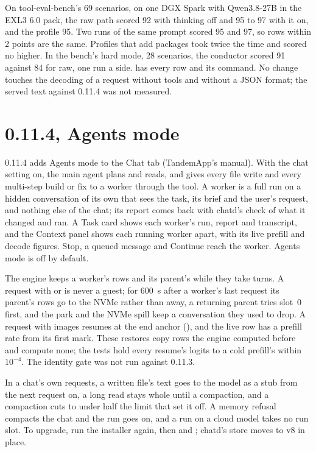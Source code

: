 On tool-eval-bench's 69 scenarios, on one DGX Spark with Qwen3.8-27B in the EXL3 6.0 pack, the raw path scored 92 with thinking off and 95 to 97 with it on, and the  profile 95. Two runs of the same prompt scored 95 and 97, so rows within 2 points are the same. Profiles that add packages took twice the time and scored no higher. In the bench's hard mode, 28 scenarios, the conductor scored 91 against 84 for raw, one run a side.  has every row and its command. No change touches the decoding of a request without tools and without a JSON format; the served text against 0.11.4 was not measured.

\section{0.11.4, Agents mode}\label{sec:changelog-0114}

0.11.4 adds Agents mode to the Chat tab (TandemApp's manual). With the chat setting  on, the main agent plans and reads, and gives every file write and every multi-step build or fix to a worker through the  tool. A worker is a full run on a hidden conversation of its own that sees the task, its brief and the user's request, and nothing else of the chat; its report comes back with chatd's check of what it changed and ran. A Task card shows each worker's run, report and transcript, and the Context panel shows each running worker apart, with its live prefill and decode figures. Stop, a queued message and Continue reach the worker. Agents mode is off by default.

The engine keeps a worker's rows and its parent's while they take turns. A request with  or  is never a guest; for 600~s after a worker's last request its parent's rows go to the NVMe rather than away, a returning parent tries slot~0 first, and the park and the NVMe spill keep a conversation they used to drop. A request with images resumes at the end anchor (), and the live row has a prefill rate from its first mark. These restores copy rows the engine computed before and compute none; the tests hold every resume's logits to a cold prefill's within $10^{-4}$. The identity gate was not run against 0.11.3.

In a chat's own requests, a written file's text goes to the model as a stub from the next request on, a long read stays whole until a compaction, and a compaction cuts to under half the limit that set it off. A memory refusal compacts the chat and the run goes on, and a run on a cloud model takes no run slot. To upgrade, run the installer again, then  and ; chatd's store moves to v8 in place.

